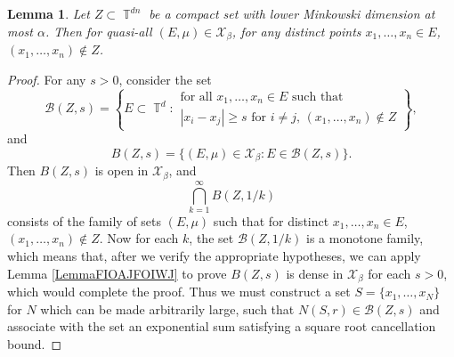 \documentclass[dvipsnames,letterpaper,12pt]{article}
\numberwithin{equation}{section}
\DeclareMathOperator{\TT}{\mathbb{T}}
\newtheorem{lemma}[theorem]{Lemma}
\numberwithin{theorem}{section}
\begin{document}
\begin{lemma} \label{LemmaVIVIJCIJSIJ}
    Let $Z \subset \TT^{dn}$ be a compact set with lower Minkowski dimension at most $\alpha$. Then for quasi-all $(E,\mu) \in \mathcal{X}_\beta$, for any distinct points $x_1, \dots, x_n \in E$, $(x_1, \dots, x_n) \not \in Z$.
\end{lemma}
\begin{proof}
    For any $s > 0$, consider the set
    \[ \mathcal{B}(Z,s) = \left\{ E \subset \TT^d: \begin{array}{c}
            \text{for all $x_1, \dots, x_n \in E$ such that}\\
            \text{$|x_i - x_j| \geq s$ for $i \neq j$, $(x_1, \dots, x_n) \not \in Z$}
        \end{array} \right\}, \]
    and
    \[ B(Z,s) = \{ (E,\mu) \in \mathcal{X}_\beta: E \in \mathcal{B}(Z,s) \}. \]
    Then $B(Z,s)$ is open in $\mathcal{X}_\beta$, and
    \begin{equation}
        \bigcap_{k = 1}^\infty B(Z,1/k)
    \end{equation}
    consists of the family of sets $(E,\mu)$ such that for distinct $x_1, \dots, x_n \in E$, $(x_1, \dots, x_n) \not \in Z$. Now for each $k$, the set $\mathcal{B}(Z,1/k)$ is a monotone family, which means that, after we verify the appropriate hypotheses, we can apply Lemma \ref{LemmaFIOAJFOIWJ} to prove $B(Z,s)$ is dense in $\mathcal{X}_\beta$ for each $s > 0$, which would complete the proof. Thus we must construct a set $S = \{ x_1, \dots, x_N \}$ for $N$ which can be made arbitrarily large, such that $N(S,r) \in \mathcal{B}(Z,s)$ and associate with the set an exponential sum satisfying a square root cancellation bound.


\end{proof}
\end{document}
